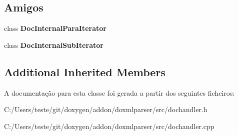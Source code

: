 \subsection*{Amigos}
\begin{DoxyCompactItemize}
\item 
\hypertarget{class_doc_internal_handler_a1fd597f22ffe4116c894d88e4cf681fc}{class {\bfseries Doc\-Internal\-Para\-Iterator}}\label{class_doc_internal_handler_a1fd597f22ffe4116c894d88e4cf681fc}

\item 
\hypertarget{class_doc_internal_handler_a36c6a46fa570a2203116c27a992e1c4e}{class {\bfseries Doc\-Internal\-Sub\-Iterator}}\label{class_doc_internal_handler_a36c6a46fa570a2203116c27a992e1c4e}

\end{DoxyCompactItemize}
\subsection*{Additional Inherited Members}


A documentação para esta classe foi gerada a partir dos seguintes ficheiros\-:\begin{DoxyCompactItemize}
\item 
C\-:/\-Users/teste/git/doxygen/addon/doxmlparser/src/dochandler.\-h\item 
C\-:/\-Users/teste/git/doxygen/addon/doxmlparser/src/dochandler.\-cpp\end{DoxyCompactItemize}
